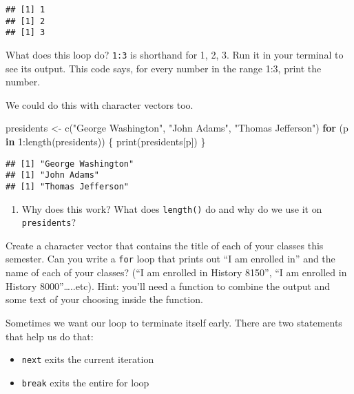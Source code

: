 \documentclass[
]{article}
\newenvironment{Shaded}{\begin{snugshade}}{\end{snugshade}}
\newcommand{\ControlFlowTok}[1]{\textcolor[rgb]{0.13,0.29,0.53}{\textbf{#1}}}
\newcommand{\DecValTok}[1]{\textcolor[rgb]{0.00,0.00,0.81}{#1}}
\newcommand{\FunctionTok}[1]{\textcolor[rgb]{0.00,0.00,0.00}{#1}}
\newcommand{\NormalTok}[1]{#1}
\newcommand{\OtherTok}[1]{\textcolor[rgb]{0.56,0.35,0.01}{#1}}
\newcommand{\SpecialCharTok}[1]{\textcolor[rgb]{0.00,0.00,0.00}{#1}}
\newcommand{\StringTok}[1]{\textcolor[rgb]{0.31,0.60,0.02}{#1}}
\providecommand{\tightlist}{%
  \setlength{\itemsep}{0pt}\setlength{\parskip}{0pt}}
\begin{document}
\begin{verbatim}
## [1] 1
## [1] 2
## [1] 3
\end{verbatim}

What does this loop do? \texttt{1:3} is shorthand for 1, 2, 3. Run it in
your terminal to see its output. This code says, for every number in the
range 1:3, print the number.

We could do this with character vectors too.

\begin{Shaded}
\begin{Highlighting}[]
\NormalTok{presidents }\OtherTok{\textless{}{-}} \FunctionTok{c}\NormalTok{(}\StringTok{"George Washington"}\NormalTok{, }\StringTok{"John Adams"}\NormalTok{, }\StringTok{"Thomas Jefferson"}\NormalTok{)}
\ControlFlowTok{for}\NormalTok{ (p }\ControlFlowTok{in} \DecValTok{1}\SpecialCharTok{:}\FunctionTok{length}\NormalTok{(presidents)) \{}
  \FunctionTok{print}\NormalTok{(presidents[p])}
\NormalTok{\}}
\end{Highlighting}
\end{Shaded}

\begin{verbatim}
## [1] "George Washington"
## [1] "John Adams"
## [1] "Thomas Jefferson"
\end{verbatim}

\begin{enumerate}
\def\labelenumi{(\arabic{enumi})}
\setcounter{enumi}{15}
\tightlist
\item
  Why does this work? What does \texttt{length()} do and why do we use
  it on \texttt{presidents}?
\end{enumerate}

\begin{quote}
\end{quote}

Create a character vector that contains the title of each of your
classes this semester. Can you write a \texttt{for} loop that prints out
``I am enrolled in'' and the name of each of your classes? (``I am
enrolled in History 8150'', ``I am enrolled in History
8000''\ldots..etc). Hint: you'll need a function to combine the output
and some text of your choosing inside the function.

Sometimes we want our loop to terminate itself early. There are two
statements that help us do that:

\begin{itemize}
\tightlist
\item
  \texttt{next} exits the current iteration
\item
  \texttt{break} exits the entire for loop
\end{itemize}
\end{document}
